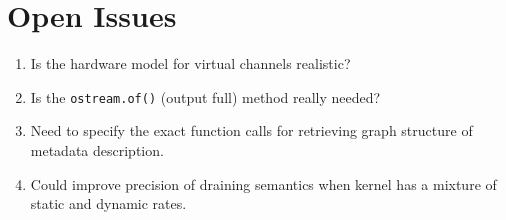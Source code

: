 \section{Open Issues}

\begin{enumerate}

\item Is the hardware model for virtual channels realistic?

\item Is the {\tt ostream.of()} (output full) method really needed?

\item Need to specify the exact function calls for retrieving graph
structure of metadata description.

\item Could improve precision of draining semantics when kernel has a
mixture of static and dynamic rates.

\end{enumerate}